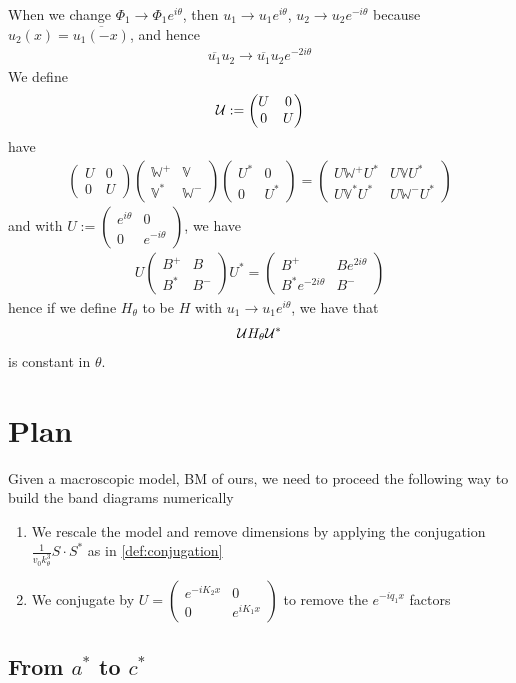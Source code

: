 \documentclass[11pt,a4paper,reqno,french,tikz]{amsart}
\newcommand{\f}[2]{\frac{#1}{#2}} %
\newcommand{\mat}[1]{\begin{pmatrix} #1 \end{pmatrix}} %
\newcommand{\bbV}{\mathbb{V}}
\def\bbV{{\mathbb V}}
\def\bbW{{\mathbb W}}
\begin{document}
When we change $\Phi_1 \rightarrow \Phi_1 e^{i\theta}$, then $u_1 \rightarrow u_1 e^{i\theta}$, $u_2 \rightarrow u_2 e^{-i\theta}$ because $u_2(x) = \overline{u_1(-x)}$, and hence
\begin{align*}
\boxed{\overline{u_1} u_2 \rightarrow \overline{u_1} u_2 e^{-2i\theta}}
\end{align*}
We define
\begin{align*}
	\cU := \mat{U & 0 \\ 0 & U}
\end{align*}
have
\begin{align*}
	\mat{U & 0 \\ 0 & U} \mat{\bbW^+ & \bbV \\ \bbV^* & \bbW^-}  \mat{U^* & 0 \\ 0 & U^*} = \mat{U\bbW^+ U^* & U\bbV U^*\\ U\bbV^*U^* & U\bbW^-U^*}
\end{align*}
and with $U := \mat{e^{i\theta} & 0 \\  0 & e^{-i\theta}}$, we have
\begin{align*}
	U \mat{B^+ & B \\ B^* & B^-} U^* = \mat{B^+ & B e^{2i\theta} \\ B^* e^{-2i\theta} & B^-}
\end{align*}
hence if we define $H_\theta$ to be $H$ with $u_1 \rightarrow u_1 e^{i\theta}$, we have that
\begin{align*}
\mathcal{U} H_\theta \mathcal{U}^*
\end{align*}
is constant in $\theta$.


\section{Plan}%
\label{sec:plan}

Given a macroscopic model, BM of ours, we need to proceed the following way to build the band diagrams numerically
\begin{enumerate}
	\item We rescale the model and remove dimensions by applying the conjugation $\f{1}{v_0 k_\theta^3} S \cdot S^*$ as in \eqref{def:conjugation}
	\item We conjugate by $U = \mat{e^{-iK_2 x} & 0 \\ 0 & e^{iK_1 x}}$ to remove the $e^{-iq_1 x}$ factors
\end{enumerate}

\subsection{From $a^*$ to $c^*$}%
\label{sub:from_a_to_c_}
\end{document}
